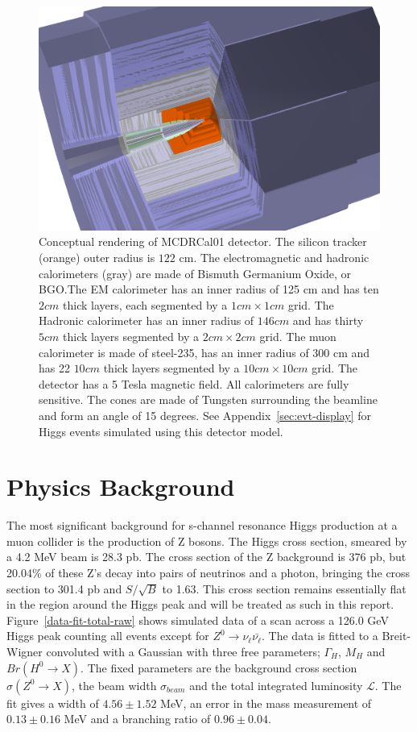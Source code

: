 \documentclass[a4paper]{article}
\begin{document}
\begin{figure}
	\includegraphics[width=\textwidth]{mcdrcal01}
	\caption{Conceptual rendering of MCDRCal01 detector. The silicon tracker (orange) outer radius is $122$ cm. The electromagnetic and hadronic calorimeters (gray) are made of Bismuth Germanium Oxide, or BGO.\@ The EM calorimeter has an inner radius of 125 cm and has ten $2 cm$ thick layers, each segmented by a $1 cm \times 1 cm$ grid. The Hadronic calorimeter has an inner radius of $146 cm$ and has thirty$ 5 cm$ thick layers segmented by a $2 cm \times 2 cm$ grid. The muon calorimeter is made of steel-235, has an inner radius of 300 cm and has 22 $10 cm$ thick layers segmented by a $10 cm \times 10 cm$ grid. The detector has a 5 Tesla magnetic field. All calorimeters are fully sensitive. The cones are made of Tungsten surrounding the beamline and form an angle of 15 degrees. See Appendix~\ref{sec:evt-display} for Higgs events simulated using this detector model.\label{fig:detector}}
\end{figure}

\section{Physics Background}
The most significant background for s-channel resonance Higgs production at a muon collider is the production of Z bosons. The Higgs cross section, smeared by a 4.2 MeV beam is 28.3 pb. The cross section of the Z background is 376 pb, but 20.04\% of these Z's decay into pairs of neutrinos and a photon, bringing the cross section to 301.4 pb and $S/\sqrt{B}$ to 1.63. This cross section remains essentially flat in the region around the Higgs peak and will be treated as such in this report. Figure~\ref{data-fit-total-raw} shows simulated data of a scan across a 126.0 GeV Higgs peak counting all events except for $Z^0\rightarrow \nu_{\ell}\bar{\nu_{\ell}}$. The data is fitted to a Breit-Wigner convoluted with a Gaussian with three free parameters; $\Gamma_H$, $M_H$ and $Br(H^0\rightarrow X)$. The fixed parameters are the background cross section $\sigma(Z^0\rightarrow X)$, the beam width $\sigma_{beam}$ and the total integrated luminosity $\mathcal{L}$. The fit gives a width of $4.56\pm 1.52$ MeV, an error in the mass measurement of $0.13\pm0.16$ MeV and a branching ratio of $0.96\pm0.04$. 
\end{document}
